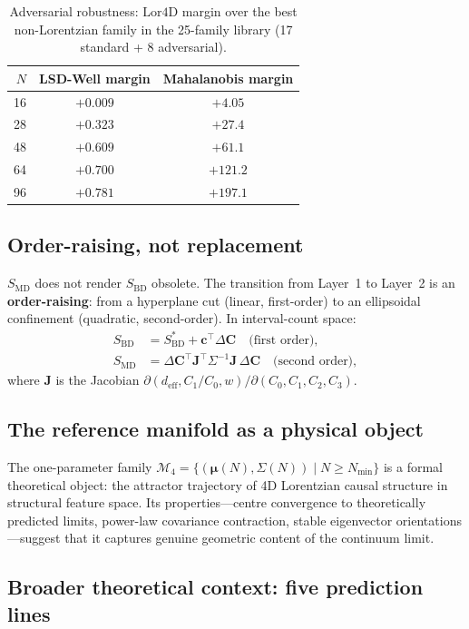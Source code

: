 \documentclass[12pt,a4paper]{article}
\newcommand{\SBD}{S_{\mathrm{BD}}}
\newcommand{\SMD}{S_{\mathrm{MD}}}
\newcommand{\deff}{d_{\mathrm{eff}}}
\newcommand{\Lor}{\mathrm{Lor4D}}
\begin{document}
\begin{table}[ht!]
\centering
\caption{Adversarial robustness: $\Lor$ margin over the best non-Lorentzian
family in the 25-family library (17 standard + 8 adversarial).}
\label{tab:adversarial}
\begin{tabular}{rcc}
\toprule
$N$ & LSD-Well margin & Mahalanobis margin \\
\midrule
16  & $+0.009$ & $+4.05$  \\
28  & $+0.323$ & $+27.4$  \\
48  & $+0.609$ & $+61.1$  \\
64  & $+0.700$ & $+121.2$ \\
96  & $+0.781$ & $+197.1$ \\
\bottomrule
\end{tabular}
\end{table}

\subsection{Order-raising, not replacement}

$\SMD$ does not render $\SBD$ obsolete.
The transition from Layer~1 to Layer~2 is an \textbf{order-raising}: from a
hyperplane cut (linear, first-order) to an ellipsoidal confinement (quadratic,
second-order).
In interval-count space:
\begin{align}
  \SBD &= S_{\mathrm{BD}}^* + \mathbf{c}^\top \Delta\mathbf{C}
  \quad\text{(first order)}, \\
  \SMD &= \Delta\mathbf{C}^\top \mathbf{J}^\top \Sigma^{-1}\mathbf{J}\,
  \Delta\mathbf{C}
  \quad\text{(second order)},
\end{align}
where $\mathbf{J}$ is the Jacobian
$\partial(\deff,C_1/C_0,w)/\partial(C_0,C_1,C_2,C_3)$.

\subsection{The reference manifold as a physical object}

The one-parameter family
$\mathcal{M}_4 = \{(\bm{\mu}(N),\Sigma(N))\mid N\geq N_{\min}\}$ is a formal
theoretical object: the attractor trajectory of 4D Lorentzian causal structure in
structural feature space.
Its properties---centre convergence to theoretically predicted limits, power-law
covariance contraction, stable eigenvector orientations---suggest that it captures
genuine geometric content of the continuum limit.

\subsection{Broader theoretical context: five prediction lines}
\end{document}
